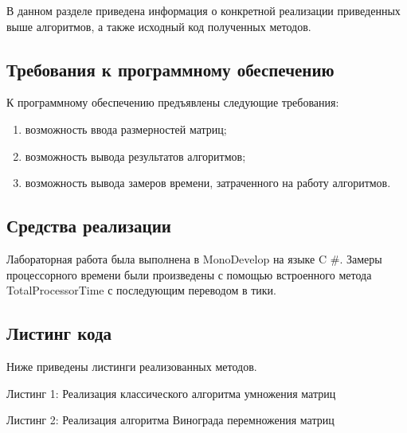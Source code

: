 \documentclass[12pt,a4paper]{scrartcl}
\begin{document}
	В данном разделе приведена информация о конкретной реализации приведенных выше алгоритмов, а также исходный код полученных методов.
	
	\subsection{Требования к программному обеспечению}
	\label{sec:tech:demands}
	
	К программному обеспечению предъявлены следующие требования:
	\begin{enumerate}
		\item{возможность ввода размерностей матриц;}
		\item{возможность вывода результатов алгоритмов;}
		\item{возможность вывода замеров времени, затраченного на работу алгоритмов.}
	\end{enumerate}
	
	\subsection{Средства реализации}
    \label{sec:tech:relise}
    
    Лабораторная работа была выполнена в MonoDevelop на языке C \#. 
	Замеры процессорного времени были произведены с помощью встроенного метода TotalProcessorTime с последующим переводом в тики.
	
	\subsection{Листинг кода}
	\label{sec:tech:listing}
	
	Ниже приведены листинги реализованных методов.
	
	
	Листинг 1: Реализация классического алгоритма умножения матриц
	
	
	\newpage
	Листинг 2: Реализация алгоритма Винограда перемножения матриц
	
	
\end{document}
